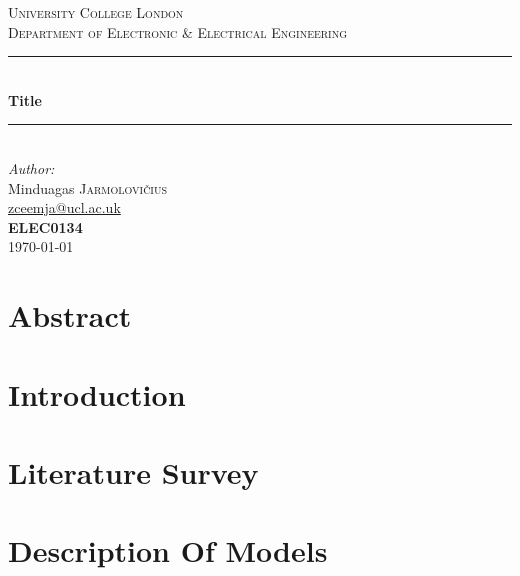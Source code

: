 \documentclass[a4paper,11pt]{article}
\begin{document}
	\begin{titlepage}
		\newcommand{\HRule}{\rule{\linewidth}{0.5mm}}
		\center
		\textsc{\Large University College London}\\[0.5cm]
		\textsc{\large Department of Electronic \& Electrical Engineering}\\[0.5cm]
		
		\HRule \\[0.4cm]
		{ \huge \bfseries Title}\\[0.4cm]
		\HRule \\[1.0cm]
		
		\Large \emph{Author:}\\
		Minduagas \textsc{Jarmolovi\v{c}ius}\\
		\href{mailto:zceemja@ucl.ac.uk}{zceemja@ucl.ac.uk}\\[0.5cm]
		
		\vfill
		{ \large \bfseries ELEC0134}\\[1cm]
		{\large\today}\\[2cm]
		
	\end{titlepage}
	
	\pagebreak
	
\section*{Abstract}

\section{Introduction}

\section{Literature Survey}

\section{Description Of Models}

\end{document}
